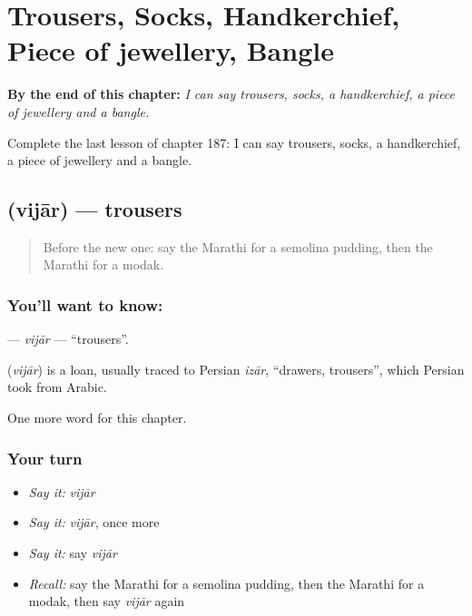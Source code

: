 
\chapter{Trousers, Socks, Handkerchief, Piece of jewellery, Bangle}
\label{ch:mr-trousers-socks-handkerchief-piece-of-jewellery-bangle}

\begin{chapteropening}
\textbf{By the end of this chapter:} \emph{I can say trousers, socks, a handkerchief, a piece of jewellery and a bangle.}

Complete the last lesson of chapter 187: I can say trousers, socks, a handkerchief, a piece of jewellery and a bangle.
\end{chapteropening}

\section[\texorpdfstring{\mr{विजार} (vijār)}{विजार (vijār)}]{ (vijār) — trousers}

\label{lesson:MR-C187-vijar}



\begin{quote}
Before the new one: say the Marathi for a semolina pudding, then the Marathi for a modak.
\end{quote}

\subsection*{You'll want to know: }
\textbf{} — \emph{vijār} — \textquotedblleft{}trousers\textquotedblright{}.

\begin{cousinweb}
\textbf{} (\emph{vijār}) is a loan, usually traced to Persian \emph{izār}, \textquotedblleft{}drawers, trousers\textquotedblright{}, which Persian took from Arabic.
\end{cousinweb}

\begin{grammarlens}[title={What you've built}]
One more word for this chapter.
\end{grammarlens}

\subsection*{Your turn}
\begin{itemize}
\raggedright
  \item \emph{Say it:} \emph{vijār}
  \item \emph{Say it:} \emph{vijār}, once more
  \item \emph{Say it:} say \emph{vijār}
  \item \emph{Recall:} say the Marathi for a semolina pudding, then the Marathi for a modak, then say \emph{vijār} again
\end{itemize}

